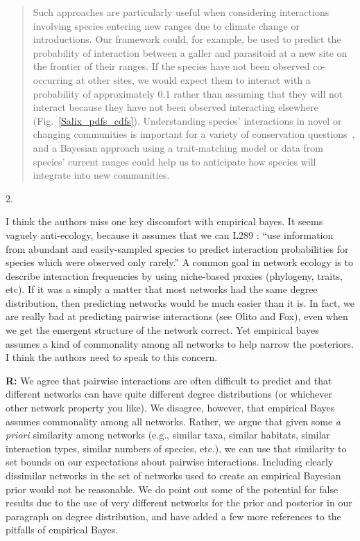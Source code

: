 \documentclass[12pt]{letter}
\newenvironment{refquote}{\bigskip \begin{it}}{\end{it}\smallskip}
\begin{document}
		\begin{quotation}

			Such approaches are particularly useful when considering interactions involving species entering new ranges due to climate change or introductions. Our framework could, for example, be used to predict the probability of interaction between a galler and parasitoid at a new site on the frontier of their ranges. If the species have not been observed co-occurring at other sites, we would expect them to interact with a probability of approximately 0.1 rather than assuming that they will not interact because they have not been observed interacting elsewhere (Fig.~\ref{Salix_pdfs_cdfs}). Understanding species' interactions in novel or changing communities is important for a variety of conservation questions~\citep{Bartomeus2013,Gravel2013}, and a Bayesian approach using a trait-matching model or data from species' current ranges could help us to anticipate how species will integrate into new communities. 

		\end{quotation}


	2. 


		\begin{refquote}

			I think the authors miss one key discomfort with empirical bayes. It seems vaguely anti-ecology, because it assumes that we can L289 : “use information from abundant and easily-sampled species to predict interaction probabilities for species which were observed only rarely.”  A common goal in network ecology is to describe interaction frequencies by using niche-based proxies (phylogeny, traits, etc). If it was a simply a matter that most networks had the same degree distribution, then predicting networks would be much easier than it is. In fact, we are really bad at predicting pairwise interactions (see Olito and Fox), even when we get the emergent structure of the network correct. Yet empirical bayes assumes a kind of commonality among all networks to help narrow the posteriors. I think the authors need to speak to this concern.

		\end{refquote}


		\textbf{R:} We agree that pairwise interactions are often difficult to predict and that different networks can have quite different degree distributions (or whichever other network property you like).  We disagree, however, that empirical Bayes assumes commonality among all networks. Rather, we argue that given some \emph{a priori} similarity among networks (e.g., similar taxa, similar habitats, similar interaction types, similar numbers of species, etc.), we can use that similarity to set bounds on our expectations about pairwise interactions. Including clearly dissimilar networks in the set of networks used to create an empirical Bayesian prior would not be reasonable. We do point out some of the potential for false results due to the use of very different networks for the prior and posterior in our paragraph on degree distribution, and have added a few more references to the pitfalls of empirical Bayes.
\end{document}
